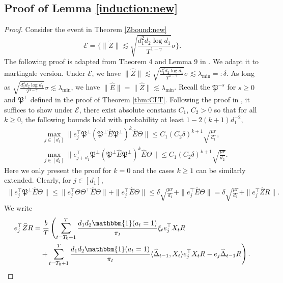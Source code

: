 \documentclass[12pt]{article}
\newcommand{\inp}[2]{\langle #1,#2\rangle}
\def\calE{{\mathcal E}}
\def\tilde{\widetilde}
\theoremstyle{plain}
\begin{document}
\subsection{Proof of Lemma \ref{induction:new}}
\begin{proof}
    Consider the event in Theorem \ref{Zbound:new}
    $$\calE = \bigg\{\|\tilde Z\|\lesssim \sqrt{\frac{d_1^2d_2\log d_1}{T^{1-\gamma}}}\sigma\bigg\}.$$
    The following proof is adapted from Theorem 4 and Lemma 9 in \cite{xia2021statistical}. We adapt it to martingale version.
    Under $\calE$, we have $\|\widehat Z\|\lesssim \sqrt{\frac{d_1^2d_2\log d_1}{T^{1-\gamma}}}\sigma\lesssim \lambda_{\min} =: \delta$. 
    As long as $\sqrt{\frac{d_1^2d_2\log d_1}{T^{1-\gamma}}}\sigma\lesssim \lambda_{\min}$, we have $\|\widehat E\|=\|\widehat Z\| \lesssim \lambda_{\min}$. 
    Recall the $\mathfrak{P}^{-s}$ for $s\geq 0$ and $\mathfrak{P}^{\perp}$ defined in the proof of Theorem \ref{thm:CLT}. Following the proof in \cite{xia2021statistical}, it suffices to show under $\calE$, there exist absolute constants $C_1$, $C_2>0$ so that for all $k\geq 0$, the following bounds hold with probability at least $1-2(k+1)d_1^{-2}$,
    \begin{align*}
        &\max_{j \in [d_1]} \|e_{j}^{\top}\mathfrak{P}^{\perp}(\mathfrak{P}^{\perp}\widehat{E}\mathfrak{P}^{\perp})^k\widehat{E}\Theta\|\leq C_1(C_2\delta)^{k+1}\sqrt{\frac{\mu r}{d_1}}, \\
        &\max_{j \in [d_2]} \|e_{j+d_1}^{\top}\mathfrak{P}^{\perp}(\mathfrak{P}^{\perp}\widehat{E}\mathfrak{P}^{\perp})^k\widehat{E}\Theta\|\leq C_1(C_2\delta)^{k+1}\sqrt{\frac{\mu r}{d_2}}.
    \end{align*}
Here we only present the proof for $k=0$ and the cases $k\geq 1$ can be similarly extended. 
    Clearly, for $j\in [d_1]$,
    \begin{align*}
        \|e_j^{\top}\mathfrak{P}^{\perp}\widehat{E}\Theta\|\leq \|e_j^{\top}\Theta\Theta^{\top}\widehat{E}\Theta\| + \|e_j^{\top}\widehat{E}\Theta\|\leq \delta\sqrt{\frac{\mu r}{d_1}} + \|e_j^{\top}\widehat{E}\Theta\|= \delta\sqrt{\frac{\mu r}{d_1}} + \|e_j^{\top}\widehat{Z}R\|. 
    \end{align*}
    We write
    \begin{align*}
        e_{j}^{\top}\widehat{Z}R &= \frac{b}{T}\left(\sum_{t=T_0+1}^T \frac{d_1d_2\mathbbm{1}(a_t=1)}{\pi_t}\xi_te_j^{\top}X_tR \right.\\ & \left.\quad + \sum_{t=T_0+1}^T \frac{d_1d_2\mathbbm{1}(a_t=1)}{\pi_t}\inp{\widehat{\Delta}_{t-1}}{X_t}e_j^{\top}X_tR - e_j\widehat{\Delta}_{t-1}R\right).

\end{align*}
\end{proof}
\end{document}
